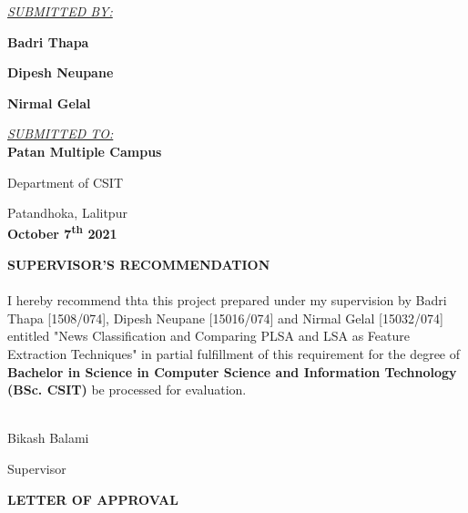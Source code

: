 \documentclass[12pt]{report}
\newcommand{\sigline}[1]{\makebox[\widthof{#1~}]{.\dotfill}\\#1}
\begin{document}
\begin{center}
    \begin{large}
        \underline{\emph{SUBMITTED BY:}}

        \textbf{Badri Thapa}

        \textbf{Dipesh Neupane}
        
        \textbf{Nirmal Gelal}\\[1.2cm]
    \end{large}
    
    \begin{large}
    \underline{\emph{SUBMITTED TO:}}\\[0.13cm]

    \textbf{Patan Multiple Campus}
    \end{large}

    \begin{large}
    Department of CSIT


    
    \end{large}
    Patandhoka, Lalitpur\\[1cm]
    \textbf{October 7\textsuperscript{th} 2021}
    \end{center}
    \newpage
    \begin{center}
    \textbf{SUPERVISOR'S RECOMMENDATION}
    \end{center}
    \paragraph{}
        I hereby recommend thta this project prepared under my supervision by Badri Thapa [1508/074], Dipesh Neupane [15016/074] and Nirmal Gelal [15032/074]
        entitled "News Classification and Comparing PLSA and LSA as Feature Extraction Techniques" in partial fulfillment of this requirement for the degree of \textbf{Bachelor in Science in Computer Science and Information Technology (BSc. CSIT)}
        be processed for evaluation. 
        \vspace{3in}

        \begin{center}
           \sigline{Bikash Balami} 
           
           Supervisor
        \end{center}


    \newpage

    \begin{center}
        \textbf{LETTER OF APPROVAL}

        

    \end{center}
\end{document}
